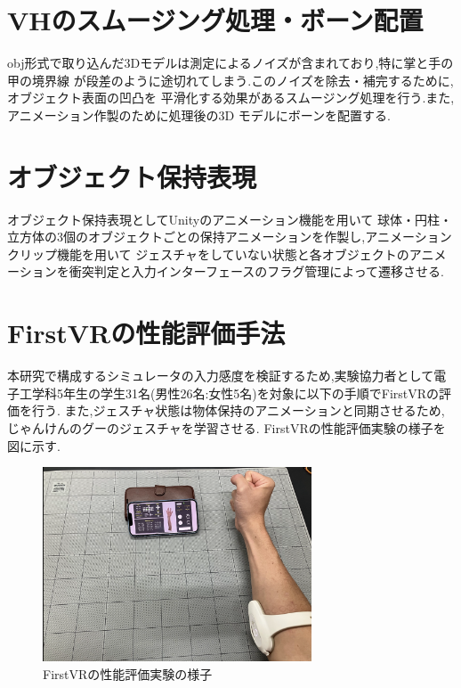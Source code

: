 \documentclass{ltjsreport}
\begin{document}
	\section{VHのスムージング処理・ボーン配置}
		obj形式で取り込んだ3Dモデルは測定によるノイズが含まれており,特に掌と手の甲の境界線
		が段差のように途切れてしまう.このノイズを除去・補完するために,オブジェクト表面の凹凸を
		平滑化する効果があるスムージング処理を行う.また,アニメーション作製のために処理後の3D
		モデルにボーンを配置する.

	\section{オブジェクト保持表現}
		オブジェクト保持表現としてUnityのアニメーション機能を用いて
		球体・円柱・立方体の3個のオブジェクトごとの保持アニメーションを作製し,アニメーションクリップ機能を用いて
		ジェスチャをしていない状態と各オブジェクトのアニメーションを衝突判定と入力インターフェースのフラグ管理によって遷移させる.

	\section{FirstVRの性能評価手法}
		本研究で構成するシミュレータの入力感度を検証するため,実験協力者として電子工学科5年生の学生31名(男性26名:女性5名)を対象に以下の手順でFirstVRの評価を行う.
		また,ジェスチャ状態は物体保持のアニメーションと同期させるため,じゃんけんのグーのジェスチャを学習させる.
		FirstVRの性能評価実験の様子を図に示す.
		\begin{figure}[H]
			\centering
			\includegraphics[width = 8cm]{../figs/IMG_5202.PNG}
			\caption{FirstVRの性能評価実験の様子}
			\label{fig:firstVRtest}
		\end{figure}
		\vspace{-15pt}
\end{document}
